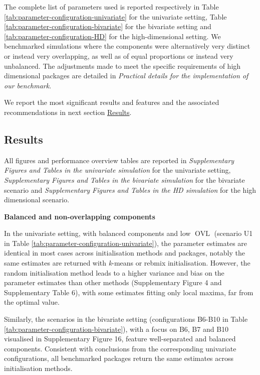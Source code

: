 The complete list of parameters used is reported respectively in Table \ref{tab:parameter-configuration-univariate} for the univariate setting, Table \ref{tab:parameter-configuration-bivariate} for the bivariate setting and \ref{tab:parameter-configuration-HD} for the high-dimensional setting. We benchmarked simulations where the components were alternatively very distinct or instead very overlapping, as well as of equal proportions or instead very unbalanced. The adjustments made to meet the specific requirements of high dimensional packages are detailed in \emph{Practical details for the implementation of our benchmark}.

We report the most significant results and features and the associated recommendations in next section \protect\hyperlink{results}{Results}.

\hypertarget{results}{%
\subsection{Results}\label{results}}

All figures and performance overview tables are reported in \emph{Supplementary Figures and Tables in the univariate simulation} for the univariate setting, \emph{Supplementary Figures and Tables in the bivariate simulation} for the bivariate scenario and \emph{Supplementary Figures and Tables in the HD simulation} for the high dimensional scenario.

\textbf{Balanced and non-overlapping components}

In the univariate setting, with balanced components and low \(\operatorname{OVL}\) (scenario U1 in Table
\ref{tab:parameter-configuration-univariate}), the parameter
estimates are identical in most cases across initialisation methods and packages, notably the same estimates are returned with \emph{k}-means or rebmix initialisation. However, the random initialisation method leads
to a higher variance and bias on the parameter estimates than other
methods (Supplementary Figure 4 and Supplementary Table 6),
with some estimates fitting only local maxima, far from the optimal value.

Similarly, the scenarios in the bivariate setting (configurations B6-B10 in Table \ref{tab:parameter-configuration-bivariate}), with a focus on B6, B7 and B10 visualised in Supplementary Figure 16, feature well-separated and balanced components. Consistent with conclusions from the corresponding univariate configurations, all benchmarked packages return the same estimates across initialisation methods.

